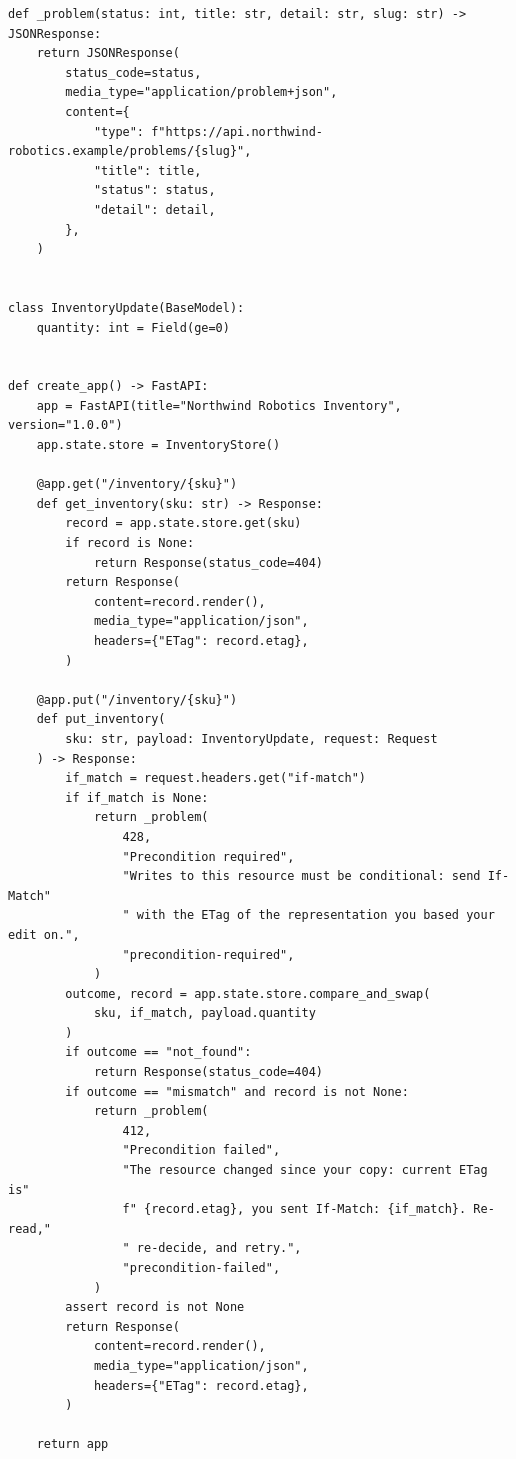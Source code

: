 \begin{verbatim}
def _problem(status: int, title: str, detail: str, slug: str) -> JSONResponse:
    return JSONResponse(
        status_code=status,
        media_type="application/problem+json",
        content={
            "type": f"https://api.northwind-robotics.example/problems/{slug}",
            "title": title,
            "status": status,
            "detail": detail,
        },
    )


class InventoryUpdate(BaseModel):
    quantity: int = Field(ge=0)


def create_app() -> FastAPI:
    app = FastAPI(title="Northwind Robotics Inventory", version="1.0.0")
    app.state.store = InventoryStore()

    @app.get("/inventory/{sku}")
    def get_inventory(sku: str) -> Response:
        record = app.state.store.get(sku)
        if record is None:
            return Response(status_code=404)
        return Response(
            content=record.render(),
            media_type="application/json",
            headers={"ETag": record.etag},
        )

    @app.put("/inventory/{sku}")
    def put_inventory(
        sku: str, payload: InventoryUpdate, request: Request
    ) -> Response:
        if_match = request.headers.get("if-match")
        if if_match is None:
            return _problem(
                428,
                "Precondition required",
                "Writes to this resource must be conditional: send If-Match"
                " with the ETag of the representation you based your edit on.",
                "precondition-required",
            )
        outcome, record = app.state.store.compare_and_swap(
            sku, if_match, payload.quantity
        )
        if outcome == "not_found":
            return Response(status_code=404)
        if outcome == "mismatch" and record is not None:
            return _problem(
                412,
                "Precondition failed",
                "The resource changed since your copy: current ETag is"
                f" {record.etag}, you sent If-Match: {if_match}. Re-read,"
                " re-decide, and retry.",
                "precondition-failed",
            )
        assert record is not None
        return Response(
            content=record.render(),
            media_type="application/json",
            headers={"ETag": record.etag},
        )

    return app
\end{verbatim}

